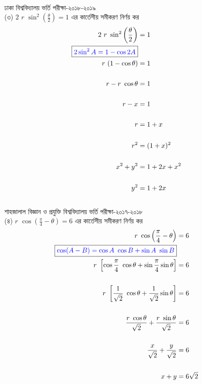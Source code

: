 \documentclass{article}
\begin{document}
\\
ঢাকা বিশ্ববিদ্যালয় ভর্তি পরীক্ষা-২০১৮-২০১৯\\
(৩)  $2\,\,r\,\,\sin^2 \left(\frac{\theta}{2}\right)=1$ এর কার্তেসীয় সমীকরণ নির্ণয় কর \\ 
\begin{align*}
	2\,\,r\,\,\sin^2 \left(\frac{\theta}{2}\right)&=1\\
	\boxed{\textcolor{blue}{2\sin^2 A=1-\cos 2A}}&\\
	r\,\,(1-\cos \theta)&=1\\
	\\
	r-r\,\,\cos \theta &=1\\
	\\
	r-x&=1\\
	\\
	r&=1+x\\
	\\
	r^2&=(1+x)^2\\
	\\
	x^2+y^2&=1+2x+x^2\\
	\\
	y^2&=1+2x
\end{align*}
\\
শাহজালাল বিজ্ঞান ও প্রযুক্তি বিশ্ববিদ্যালয় ভর্তি পরীক্ষা-২০১৭-২০১৮\\ 
(৪)  $r\,\,\cos \left(\frac{\pi}{4}-\theta\right)=6$ এর কার্তেসীয় সমীকরণ নির্ণয় কর \\ 
\begin{align*}
	r\,\,\cos \left(\frac{\pi}{4}-\theta\right)&=6\\
	\boxed{\textcolor{blue}{\cos (A-B)=\cos A\,\,\cos B+\sin A\,\,\sin B}}&\\ 
	r\,\,\left[\cos \frac{\pi}{4}\,\,\cos \theta +\sin \frac{\pi}{4} \sin \theta\right]&=6\\
	\\
	r\,\,\left[ \frac{1}{\sqrt{2}}\,\,\cos \theta + \frac{1}{\sqrt{2}} \sin \theta\right]&=6\\
	\\
	 \frac{r\,\,\cos \theta}{\sqrt{2}} + \frac{r\,\,\sin \theta}{\sqrt{2}} &=6\\
	 \\
	 \frac{x}{\sqrt{2}} + \frac{y}{\sqrt{2}} &=6\\
	 \\
	 x+y&=6\sqrt{2}
\end{align*}
\end{document}
